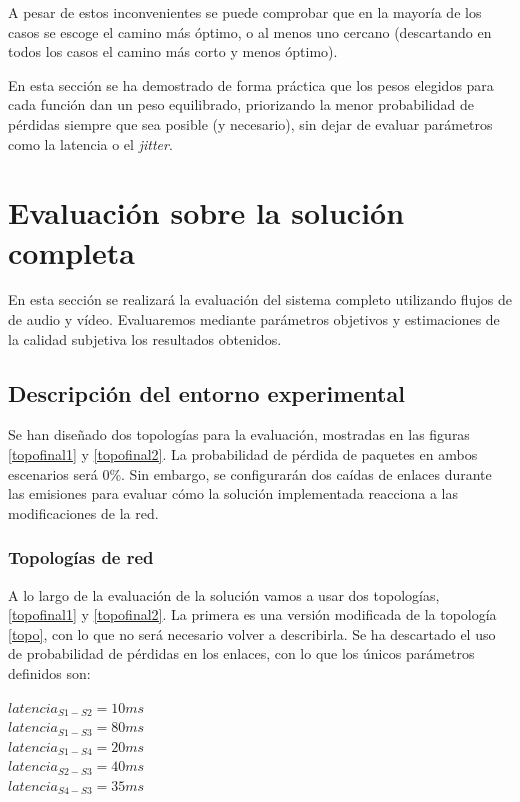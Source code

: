 \documentclass[a4paper,11pt]{book}
\begin{document}
A pesar de estos inconvenientes se puede comprobar que en la mayoría de los casos se escoge el camino más óptimo, o al menos uno cercano (descartando en todos los casos el camino más corto y menos óptimo). 

En esta sección se ha demostrado de forma práctica que los pesos elegidos para cada función dan un peso equilibrado, priorizando la menor probabilidad de pérdidas siempre que sea posible (y necesario), sin dejar de evaluar parámetros como la latencia o el \textit{jitter}.

%
%
\section{Evaluación sobre la solución completa} \label{sec:evaluacion4}
\label{lastEvaluation}

 En esta sección se realizará la evaluación del sistema completo utilizando flujos de de audio y vídeo. Evaluaremos mediante parámetros objetivos y estimaciones de la calidad subjetiva los resultados obtenidos. 

\subsection{Descripción del entorno experimental}

Se han diseñado dos topologías para la evaluación, mostradas en las figuras \ref{topofinal1} y \ref{topofinal2}. La probabilidad de pérdida de paquetes en ambos escenarios será $0\%$. Sin embargo, se configurarán dos caídas de enlaces durante las emisiones para evaluar cómo la solución implementada reacciona a las modificaciones de la red.

\subsubsection{Topologías de red}
A lo largo de la evaluación de la solución vamos a usar dos topologías, \ref{topofinal1} y \ref{topofinal2}. La primera es una versión modificada de la topología \ref{topo}, con lo que no será necesario volver a describirla. Se ha descartado el uso de probabilidad de pérdidas en los enlaces, con lo que los únicos parámetros definidos son:

\begin{center}
$latencia_{S1-S2}=10 ms$\\
$latencia_{S1-S3}=80 ms$\\
$latencia_{S1-S4}=20 ms$\\
$latencia_{S2-S3}=40 ms$\\
$latencia_{S4-S3}=35 ms$
\end{center}
\end{document}

